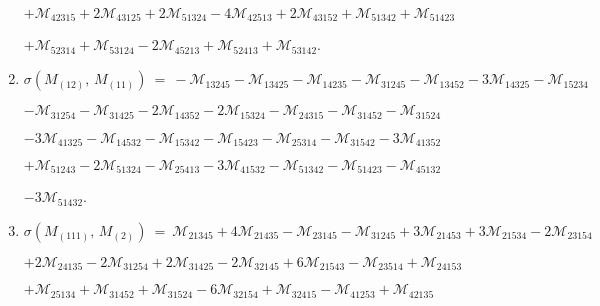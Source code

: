 \documentclass[12pt]{article}
\newcommand{\M}{\mathcal{M}}
\begin{document}
\begin{enumerate}
      \hspace{10pt}
      $+\M_{42315} 
       +2\M_{43125} +2\M_{51324} 
       -4\M_{42513} +2\M_{43152} 
       +\M_{51342} +\M_{51423} $\vspace{-6pt}

      \hspace{10pt}
      $+\M_{52314} +\M_{53124} 
       -2\M_{45213} +\M_{52413} 
       +\M_{53142} $.\vspace{-8pt}
\item[]\hspace{-50pt}$\sigma(M_{(12)},\,M_{(11)})\ =\ 
        -\M_{13245} -\M_{13425} 
       -\M_{14235} -\M_{31245} 
       -\M_{13452} -3\M_{14325} 
       -\M_{15234} $\vspace{-6pt}

      \hspace{10pt}
      $-\M_{31254} 
       -\M_{31425} -2\M_{14352} 
       -2\M_{15324} -\M_{24315} 
       -\M_{31452} -\M_{31524} $\vspace{-6pt}

      \hspace{10pt}
      $-3\M_{41325} -\M_{14532} 
       -\M_{15342} -\M_{15423} 
       -\M_{25314} -\M_{31542} 
       -3\M_{41352} $\vspace{-6pt}

      \hspace{10pt}
      $+\M_{51243} 
       -2\M_{51324} -\M_{25413} 
       -3\M_{41532} -\M_{51342} 
       -\M_{51423} -\M_{45132} $\vspace{-6pt}

      \hspace{10pt}
      $-3\M_{51432} $.\vspace{-8pt}
\item[]\hspace{-50pt}$\sigma(M_{(111)},\,M_{(2)})\ =\ 
        \M_{21345} +4\M_{21435} 
       -\M_{23145} -\M_{31245} 
       +3\M_{21453} +3\M_{21534} 
       -2\M_{23154} $\vspace{-6pt}

      \hspace{10pt}
      $+2\M_{24135} 
       -2\M_{31254} +2\M_{31425} 
       -2\M_{32145} +6\M_{21543} 
       -\M_{23514} +\M_{24153} $\vspace{-6pt}

      \hspace{10pt}
      $+\M_{25134} +\M_{31452} 
       +\M_{31524} -6\M_{32154} 
       +\M_{32415} -\M_{41253} 
       +\M_{42135} $\vspace{-6pt}


\end{enumerate}
\end{document}
